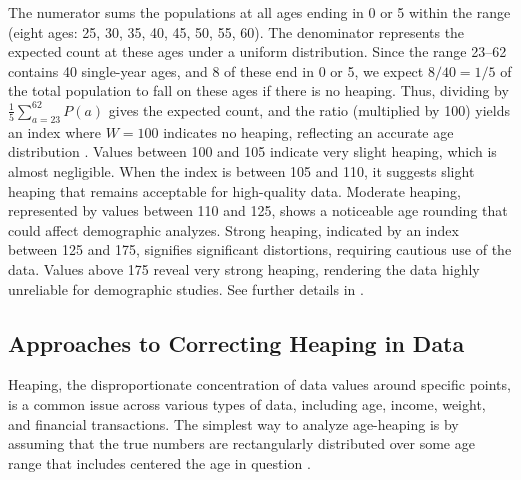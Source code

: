 \documentclass[pdflatex,sn-mathphys-num]{sn-jnl}%
\theoremstyle{thmstyleone}%
\theoremstyle{thmstyletwo}%
\theoremstyle{thmstylethree}%
\begin{document}
The numerator sums the populations at all ages ending in 0 or 5 within the 
range (eight ages: 25, 30, 35, 40, 45, 50, 55, 60). 
The denominator represents the expected count at these ages under 
a uniform distribution. Since the range 23--62 contains 40 single-year ages, 
and 8 of these end in 0 or 5, we expect $8/40 = 1/5$ of the total 
population to fall on these ages if there is no heaping. 
Thus, dividing by $\frac{1}{5} \sum_{a=23}^{62} P(a)$ gives the 
expected count, and the ratio (multiplied by 100) yields an index 
where $W = 100$ indicates no heaping, reflecting an accurate age distribution \cite{un55}. 
Values between 100 and 105 indicate very slight heaping, which is almost negligible. When the index is between 105 and 110, it suggests slight heaping that remains acceptable for high-quality data. Moderate heaping, represented by values between 110 and 125, shows a noticeable age rounding that could affect demographic analyzes. Strong heaping, indicated by an index between 125 and 175, signifies significant distortions, requiring cautious use of the data. Values above 175 reveal very strong heaping, rendering the data highly unreliable for demographic studies. See further details in \citep{shryock76}.

%






\subsection{Approaches to Correcting Heaping in Data}

Heaping, the disproportionate concentration of data values around specific points, is a common issue across various types of data, including age, income, weight, and financial transactions. 
The simplest way to analyze age-heaping is by assuming that the true numbers are rectangularly distributed over some age range that includes centered the age in question \citep{hobbs2004}.
\end{document}
